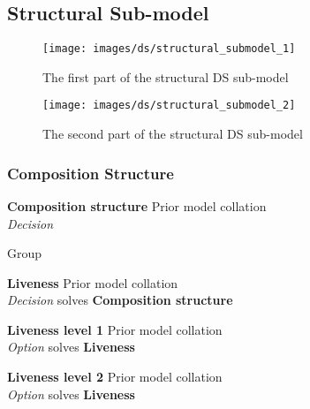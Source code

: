 \subsection{Structural Sub-model}

\begin{figure}[htb]
	\centering
	\texttt{[image: images/ds/structural\_submodel\_1]}
	\caption{The first part of the structural DS sub-model}
	\label{ds:fig:structural1}
\end{figure}

\begin{figure}[htb]
	\centering
	\texttt{[image: images/ds/structural\_submodel\_2]}
	\caption{The second part of the structural DS sub-model}
	\label{ds:fig:structural2}
\end{figure}

\clearpage

\subsubsection{Composition Structure}

\textbf{Composition structure} \hfill Prior model collation \\ \emph{Decision} \hfill 

Group

\textbf{Liveness} \hfill Prior model collation \cite{Aghaee2012} \\ \emph{Decision} \hfill solves \textbf{Composition structure}


\textbf{Liveness level 1} \hfill Prior model collation \cite{Aghaee2012} \\ \emph{Option} \hfill solves \textbf{Liveness}


\textbf{Liveness level 2} \hfill Prior model collation \cite{Aghaee2012} \\ \emph{Option} \hfill solves \textbf{Liveness}

